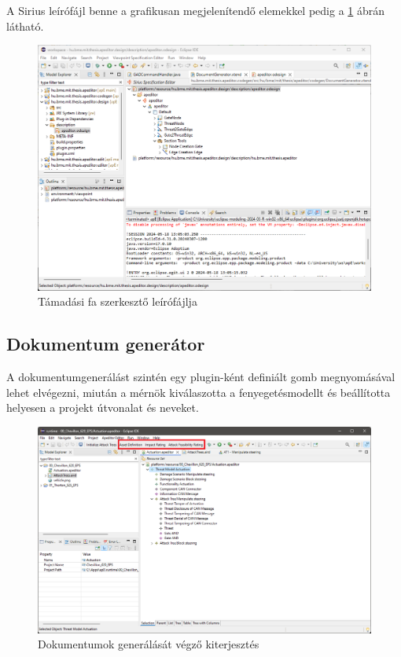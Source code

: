 A Sirius leírófájl benne a grafikusan megjelenítendő elemekkel pedig a \ref{fig:05_ateditor_4} ábrán látható.

\begin{figure}[!ht]
	\centering
	\includegraphics[width=130mm, keepaspectratio]{figures/05_ateditor_4.png}
	\caption{Támadási fa szerkesztő leírófájlja}
	\label{fig:05_ateditor_4}
\end{figure}

\subsection{Dokumentum generátor}

A dokumentumgenerálást szintén egy plugin-ként definiált gomb megnyomásával lehet elvégezni, miután a mérnök kiválaszotta a fenyegetésmodellt és beállította helyesen a projekt útvonalat és neveket.

\begin{figure}[!ht]
	\centering
	\includegraphics[width=130mm, keepaspectratio]{figures/05_docgen_1.png}
	\caption{Dokumentumok generálását végző kiterjesztés}
\end{figure}

